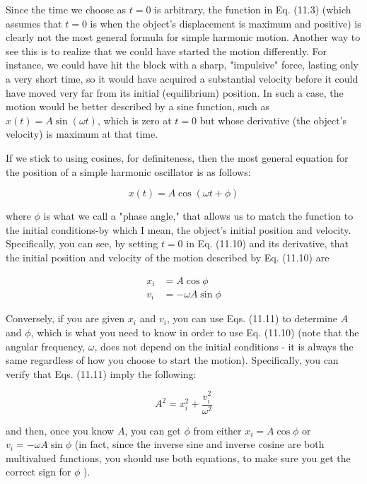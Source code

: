 \documentclass[10pt]{article}
\begin{document}
Since the time we choose as $t=0$ is arbitrary, the function in Eq. (11.3) (which assumes that $t=0$ is when the object's displacement is maximum and positive) is clearly not the most general formula for simple harmonic motion. Another way to see this is to realize that we could have started the motion differently. For instance, we could have hit the block with a sharp, "impulsive" force, lasting only a very short time, so it would have acquired a substantial velocity before it could have moved very far from its initial (equilibrium) position. In such a case, the motion would be better described by a sine function, such as $x(t)=A \sin (\omega t)$, which is zero at $t=0$ but whose derivative (the object's velocity) is maximum at that time.

If we stick to using cosines, for definiteness, then the most general equation for the position of a simple harmonic oscillator is as follows:


\begin{equation*}
x(t)=A \cos (\omega t+\phi) \tag{11.10}
\end{equation*}


where $\phi$ is what we call a "phase angle," that allows us to match the function to the initial conditions-by which I mean, the object's initial position and velocity. Specifically, you can see, by setting $t=0$ in Eq. (11.10) and its derivative, that the initial position and velocity of the motion described by Eq. (11.10) are


\begin{align*}
x_{i} & =A \cos \phi \\
v_{i} & =-\omega A \sin \phi \tag{11.11}
\end{align*}


Conversely, if you are given $x_{i}$ and $v_{i}$, you can use Eqs. (11.11) to determine $A$ and $\phi$, which is what you need to know in order to use Eq. (11.10) (note that the angular frequency, $\omega$, does not depend on the initial conditions - it is always the same regardless of how you choose to start the motion). Specifically, you can verify that Eqs. (11.11) imply the following:


\begin{equation*}
A^{2}=x_{i}^{2}+\frac{v_{i}^{2}}{\omega^{2}} \tag{11.12}
\end{equation*}


and then, once you know $A$, you can get $\phi$ from either $x_{i}=A \cos \phi$ or $v_{i}=-\omega A \sin \phi$ (in fact, since the inverse sine and inverse cosine are both multivalued functions, you should use both equations, to make sure you get the correct sign for $\phi$ ).
\end{document}
